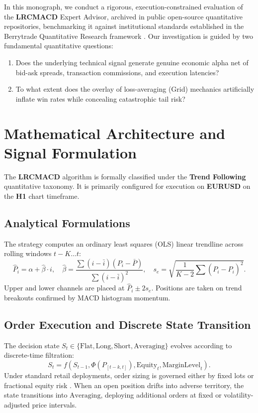 \documentclass[11pt,a4paper]{article}
\begin{document}
In this monograph, we conduct a rigorous, execution-constrained evaluation of the \textbf{LRCMACD} Expert Advisor, archived in public open-source quantitative repositories, benchmarking it against institutional standards established in the Berrytrade Quantitative Research framework \cite{artsu2026illusion}. Our investigation is guided by two fundamental quantitative questions:
\begin{enumerate}
    \item Does the underlying technical signal generate genuine economic alpha net of bid-ask spreads, transaction commissions, and execution latencies?
    \item To what extent does the overlay of loss-averaging (Grid) mechanics artificially inflate win rates while concealing catastrophic tail risk?
\end{enumerate}

\section{Mathematical Architecture and Signal Formulation}
The \textbf{LRCMACD} algorithm is formally classified under the \textbf{Trend Following} quantitative taxonomy. It is primarily configured for execution on \textbf{EURUSD} on the \textbf{H1} chart timeframe.

\subsection{Analytical Formulations}

The strategy computes an ordinary least squares (OLS) linear trendline across rolling windows $t-K \dots t$:
\begin{equation}
\hat{P}_i = \hat{\alpha} + \hat{\beta} \cdot i, \quad \hat{\beta} = \frac{\sum (i - \bar{i})(P_i - \bar{P})}{\sum (i - \bar{i})^2}, \quad s_e = \sqrt{\frac{1}{K-2}\sum (P_i - \hat{P}_i)^2}.
\end{equation}
Upper and lower channels are placed at $\hat{P}_i \pm 2 s_e$. Positions are taken on trend breakouts confirmed by MACD histogram momentum.


\subsection{Order Execution and Discrete State Transition}
The decision state $S_t \in \{\text{Flat}, \text{Long}, \text{Short}, \text{Averaging}\}$ evolves according to discrete-time filtration:
\begin{equation}
S_{t} = f(S_{t-1}, \Phi(P_{[t-k, t]}), \text{Equity}_t, \text{MarginLevel}_t).
\end{equation}
Under standard retail deployments, order sizing is governed either by fixed lots or fractional equity risk \cite{lopez2018advances, carhart1997persistence}. When an open position drifts into adverse territory, the state transitions into $\text{Averaging}$, deploying additional orders at fixed or volatility-adjusted price intervals.
\end{document}
